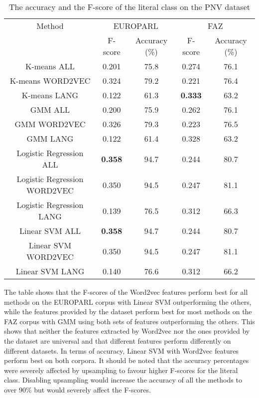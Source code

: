 \documentclass[11pt]{article}
\begin{document}
\begin{table*}[t]
\centering
\begin{tabular}{|c|cc|cc|} \hline
\multicolumn{1}{|c|}{Method} & 
\multicolumn{2}{|c|}{EUROPARL} &
\multicolumn{2}{|c|}{FAZ} \\ 
 			& F-score & Accuracy (\%) & F-score & Accuracy (\%) \\ \hline
 K-means ALL 		& 0.201 & 75.8 & 0.274 & 76.1  \\  
 K-means WORD2VEC 	& 0.324 & 79.2 & 0.221 & 76.4 \\ 
 K-means LANG 		& 0.122 & 61.3 & \textbf{0.333} &  63.2\\ \hline
 
 GMM ALL 		& 0.200	& 75.9 & 0.262 & 76.1  \\  
 GMM WORD2VEC 	& 0.326 & 79.3 & 0.223 & 76.5  \\ 
 GMM LANG 		& 0.122	& 61.4 & 0.328 &  63.2 \\ \hline
 
 Logistic Regression ALL 		& \textbf{0.358}  	& 94.7  & 0.244 & 80.7 \\  
 Logistic Regression WORD2VEC 	& 0.350  	& 94.5 & 0.247 & 81.1 \\ 
 Logistic Regression LANG 		& 0.139 	& 76.5 & 0.312 & 66.3 \\ \hline
 
 Linear SVM ALL 		& \textbf{0.358} & 94.7 & 0.244 & 80.7 \\  
 Linear SVM WORD2VEC 	& 0.350 & 94.5 & 0.247 & 81.1 \\ 
 Linear SVM LANG 		& 0.140 & 76.6  & 0.312 & 66.2 \\ \hline
 
\end{tabular}
\caption{The accuracy and the F-score of the literal class on the PNV dataset}
\end{table*}

The table shows that the F-scores of the Word2vec features perform best for all methods on the EUROPARL corpus with Linear SVM outperforming the others, while the features provided by the dataset perform best for most methods on the FAZ corpus with GMM using both sets of features outperforming the others. This shows that neither the features extracted by Word2vec nor the ones provided by the dataset are universal and that different features perform differently on different datasets. In terms of accuracy, Linear SVM with Word2vec features perform best on both corpora. It should be noted that the accuracy percentages were severely affected by upsampling to favour higher F-scores for the literal class. Disabling upsampling would increase the accuracy of all the methods to over 90\% but would severely affect the F-scores.    
\end{document}
